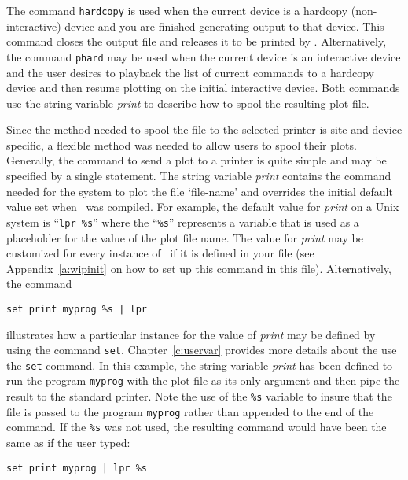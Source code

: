 The command
{\tt hardcopy}
is used when the current device is a hardcopy (\ie non-interactive) device
and you are finished generating output to that device.
This command closes the output file and releases it to be printed by \wip.
Alternatively, the command {\tt phard} may be
used when the current device is an interactive device and the user
desires to playback the list of current commands to a hardcopy device
and then resume plotting on the initial interactive device.
Both commands use the string variable {\em print} to describe how to
spool the resulting plot file.

Since the method needed to spool the file to the selected printer
is site and device specific, a flexible method was needed to allow users
to spool their plots.
Generally, the command to send a plot to a printer is quite simple and
may be specified by a single statement.
The string variable {\em print}
contains the command needed for the system to plot the file `file-name'
and overrides the initial default value set when \wip\ was compiled.
For example, the default value for
{\em print}
on a Unix system is ``{\tt lpr \%s}'' where the ``{\tt \%s}''
represents a variable that is used
as a placeholder for the value of the plot file name.
The value for {\em print} may be customized for every instance of \wip\ if
it is defined in your \wipinit{} file
(see Appendix~\ref{a:wipinit} on how to set up this command in this file).
Alternatively, the command
\begin{wiplist}%
  \item {\tt set print myprog \%s \verb+|+ lpr}
\end{wiplist}
illustrates how a particular instance for the value of
{\em print}
may be defined by using the command {\tt set}.
Chapter~\ref{c:uservar} provides more details about the use the
{\tt set} command.
In this example, the string variable {\em print} has been defined to
run the program {\tt myprog} with the plot file as its only
argument and then pipe the result to the standard printer.
Note the use of the {\tt \%s} variable to insure that the file is passed
to the program {\tt myprog} rather than appended to the end of the command.
If the {\tt \%s} was not used, the resulting command would have been
the same as if the user typed:
\begin{wiplist}%
  \item {\tt set print myprog \verb+|+ lpr \%s}
\end{wiplist}


